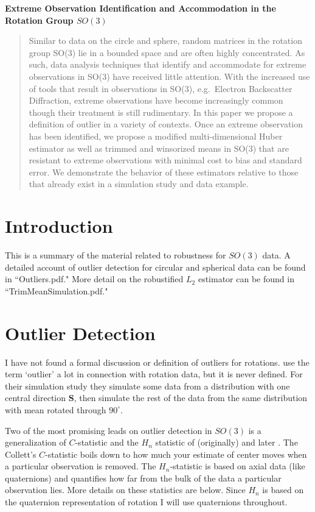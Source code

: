 \documentclass{article}\usepackage[]{graphicx}\usepackage[]{color}
\begin{document}
\begin{center}
\Large{\bf Extreme Observation Identification and Accommodation in the Rotation Group $SO(3)$}
\end{center}
\begin{abstract}
Similar to data on the circle and sphere, random matrices in the rotation group SO(3) lie in a bounded space and are often highly concentrated.  As such, data analysis techniques that identify and accommodate for extreme observations in SO(3) have received little attention.  With the increased use of tools that result in observations in SO(3), e.g.~Electron Backscatter Diffraction, extreme observations have become increasingly common though their treatment is still rudimentary.  In this paper we propose a definition of outlier in a variety of contexts.  Once an extreme observation has been identified, we propose a modified multi-dimensional Huber estimator as well as trimmed and winsorized means in SO(3) that are resistant to extreme observations with minimal cost to bias and standard error.  We demonstrate the behavior of these estimators relative to those that already exist in a simulation study and data example.
\end{abstract}

\section{Introduction}\label{sec:intro}
This is a summary of the material related to robustness for $SO(3)$ data.  A detailed account of outlier detection for circular and spherical data can be found in ``Outliers.pdf."  More detail on the robustified $L_2$ estimator can be found in ``TrimMeanSimulation.pdf."



 
\section{Outlier Detection}\label{sec:outliers}
 
I have not found a formal discussion or definition of outliers for rotations. \cite{fletcher2008} use the term `outlier' a lot in connection with rotation data, but it is never defined.  For their simulation study they simulate some data from a distribution with one central direction $\bm S$, then simulate the rest of the data from the same distribution with mean rotated through $90^\circ$.

Two of the most promising leads on outlier detection in $SO(3)$ is a generalization of \cite{collett1980} $C$-statistic and the $H_n$ statistic of (originally) \cite{best1986} and later \cite{figueiredo2005}.  The Collett's $C$-statistic boils down to how much your estimate of center moves when a particular observation is removed.  The $H_n$-statistic is based on axial data (like quaternions) and quantifies how far from the bulk of the data a particular observation lies.  More details on these statistics are below.  Since $H_n$ is based on the quaternion representation of rotation I will use quaternions throughout. 
\end{document}

